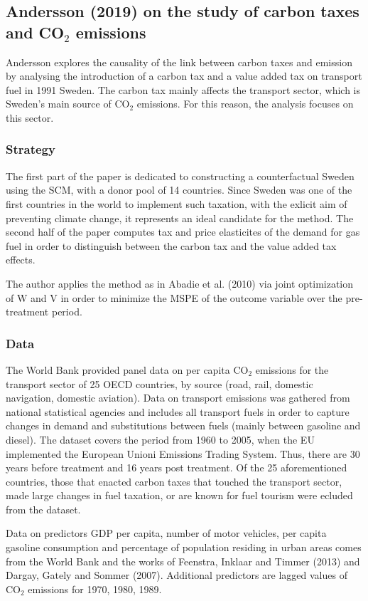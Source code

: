 \documentclass[12pt,a4paper,draft]{article}
\begin{document}
\subsection{Andersson (2019) on the study of carbon taxes and CO$_2$ emissions}
Andersson explores the causality of the link between carbon taxes and emission by analysing 
the introduction of a carbon tax and a value added tax on transport fuel in 1991 Sweden. 
The carbon tax mainly affects the transport sector, which is Sweden's main source of 
CO$_2$ emissions. For this reason, the analysis focuses on this sector.

\subsubsection*{Strategy}
The first part of the paper is dedicated to constructing a counterfactual Sweden using 
the SCM, with a donor pool of 14 countries.
Since Sweden was one of the first countries 
in the world to implement such taxation, with the exlicit aim of preventing climate change, 
it represents an ideal candidate for the method.
The second half of the paper computes tax and price elasticites of the demand for gas fuel 
in order to distinguish between the carbon tax and the value added tax effects. 

The author applies the method as in Abadie et al. (2010) via joint optimization of W and V 
in order to minimize the MSPE of the outcome variable over the pre-treatment period.  


\subsubsection*{Data}
The World Bank provided panel data on per capita CO$_2$ emissions for the transport sector 
of 25 OECD countries, by source (road, rail, domestic navigation, domestic aviation). 
Data on transport emissions was gathered from national statistical agencies and includes 
all transport fuels in order to capture changes in demand and substitutions between fuels 
(mainly between gasoline and diesel). The dataset covers the period from 1960 to 2005, when 
the EU implemented the European Unioni Emissions Trading System. 
Thus, there are 30 years before treatment and 16 years post treatment.
Of the 25 aforementioned countries, those that enacted carbon taxes that touched the 
transport sector, made large changes in fuel taxation, or are known for fuel tourism were 
ecluded from the dataset.

Data on predictors GDP per capita, number of motor vehicles, per capita gasoline consumption 
and percentage of population residing in urban areas comes from the World Bank and the works 
of Feenstra, Inklaar and Timmer (2013) and Dargay, Gately and Sommer (2007). Additional 
predictors are lagged values of CO$_2$ emissions for 1970, 1980, 1989.
\end{document}
